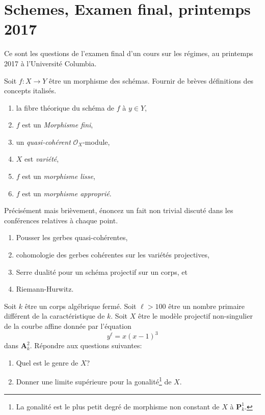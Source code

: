 \section{Schemes, Examen final, printemps 2017}
\label{section-final-exam-spring-2017}

\noindent
Ce sont les questions de l'examen final d'un cours sur les
régimes, au printemps 2017 à l'Université Columbia.

\begin{exercise}[Definitions]
\label{exercise-definitions-spring-2017}
Soit $f : X \to Y$ être un
morphisme des schémas. Fournir de brèves définitions des concepts italisés.
\begin{enumerate}
\item la fibre théorique du schéma {\it } de $f$ à $y \in Y$,
\item $f$ est un {\it Morphisme fini},
\item un {\it quasi-cohérent} $\mathcal{O}_X$-module,
\item $X$ est {\it variété},
\item $f$ est un {\it morphisme lisse},
\item $f$ est un {\it morphisme approprié}.
\end{enumerate}
\end{exercise}

\begin{exercise}[Theorems]
\label{exercise-results-spring-2017}
Précisément mais brièvement, énoncez un fait non trivial discuté dans les conférences
relatives à chaque point.
\begin{enumerate}
\item Pousser les gerbes quasi-cohérentes,
\item cohomologie des gerbes cohérentes sur les variétés projectives,
\item Serre dualité pour un schéma projectif sur un corps, et
\item Riemann-Hurwitz.
\end{enumerate}
\end{exercise}

\begin{exercise}
\label{exercise-compute-degree}
Soit $k$ être un corps algébrique fermé.
Soit $\ell > 100$ être un nombre primaire différent
de la caractéristique de $k$. Soit $X$ être le modèle projectif non-singulier
de la courbe affine donnée par l'équation
$$
y^\ell = x(x - 1)^3
$$
dans $\mathbf{A}^2_k$. Répondre aux questions suivantes:
\begin{enumerate}
\item Quel est le genre de $X$?
\item Donner une limite supérieure
pour la gonalité\footnote{La gonalité est le plus petit degré de morphisme
non constant de $X$ à $\mathbf{P}^1_k$.} de $X$.
\end{enumerate}
\end{exercise}

